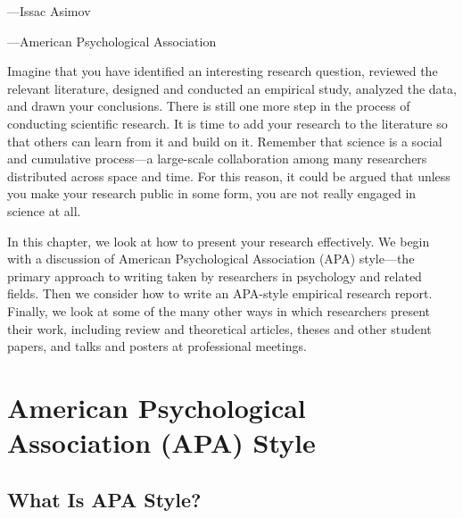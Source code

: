  {---Issac Asimov}

 {---American Psychological Association}


Imagine that you have identified an interesting research question, reviewed the relevant literature, designed and conducted an empirical study, analyzed the data, and drawn your conclusions. There is still one more step in the process of conducting scientific research. It is time to add your research to the literature so that others can learn from it and build on it. Remember that science is a social and cumulative process---a large-scale collaboration among many researchers distributed across space and time. For this reason, it could be argued that unless you make your research public in some form, you are not really engaged in science at all.




In this chapter, we look at how to present your research effectively. We begin with a discussion of American Psychological Association (APA) style---the primary approach to writing taken by researchers in psychology and related fields. Then we consider how to write an APA-style empirical research report. Finally, we look at some of the many other ways in which researchers present their work, including review and theoretical articles, theses and other student papers, and talks and posters at professional meetings.
  

\section{American Psychological Association (APA) Style}


\subsection{
What Is APA Style?}



